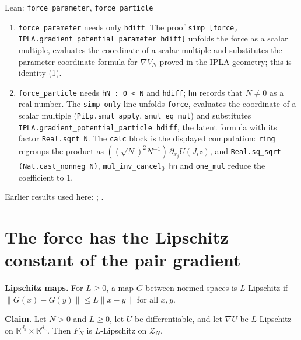 \documentclass[11pt,a4paper]{article}
\begin{document}
\begin{leanbox}{Lean: \texttt{force\_\allowbreak{}parameter}, \texttt{force\_\allowbreak{}particle}}
\begin{enumerate}
\item \texttt{force\_\allowbreak{}parameter} needs only \texttt{hdiff}. The proof \texttt{simp [force, IPLA.\allowbreak{}gradient\_\allowbreak{}potential\_\allowbreak{}parameter hdiff]} unfolds the force as a scalar multiple, evaluates the coordinate of a scalar multiple and substitutes the parameter-coordinate formula for \(\nabla V_N\) proved in the IPLA geometry; this is identity (1).

\item \texttt{force\_\allowbreak{}particle} needs \texttt{h\allowbreak{}N : 0 < N} and \texttt{hdiff}; \texttt{hn} records that \(N\ne0\) as a real number. The \texttt{simp only} line unfolds \texttt{force}, evaluates the coordinate of a scalar multiple (\texttt{Pi\allowbreak{}Lp.\allowbreak{}smul\_\allowbreak{}apply}, \texttt{smul\_\allowbreak{}eq\_\allowbreak{}mul}) and substitutes \texttt{IPLA.\allowbreak{}gradient\_\allowbreak{}potential\_\allowbreak{}particle hdiff}, the latent formula with its factor \texttt{Real.\allowbreak{}sqrt N}. The \texttt{calc} block is the displayed computation: \texttt{ring} regroups the product as \(((\sqrt N)^2N^{-1})\,\partial_{x_j}U(J_iz)\), and \texttt{Real.\allowbreak{}sq\_\allowbreak{}sqrt (Nat.\allowbreak{}cast\_\allowbreak{}nonneg N)}, \texttt{mul\_\allowbreak{}inv\_\allowbreak{}cancel\ensuremath{{}_{0}} hn} and \texttt{one\_\allowbreak{}mul} reduce the coefficient to \(1\).

\end{enumerate}
\end{leanbox}


Earlier results used here: \cite[Section~3.1.1]{LangevinLean2026IPLA}; \cite[Section~3.1.5]{LangevinLean2026IPLA}.

\section{\texorpdfstring{The force has the Lipschitz constant of the pair gradient}{The force has the Lipschitz constant of the pair gradient}}


\textbf{Lipschitz maps.} For \(L\ge0\), a map \(G\) between normed spaces is \(L\)-Lipschitz if \(\|G(x)-G(y)\|\le L\|x-y\|\) for all \(x,y\).




\textbf{Claim.} Let \(N>0\) and \(L\ge0\), let \(U\) be differentiable, and let \(\nabla U\) be \(L\)-Lipschitz on \(\mathbb R^{d_\theta}\times\mathbb R^{d_x}\). Then \(F_N\) is \(L\)-Lipschitz on \(\mathcal Z_N\).
\end{document}
